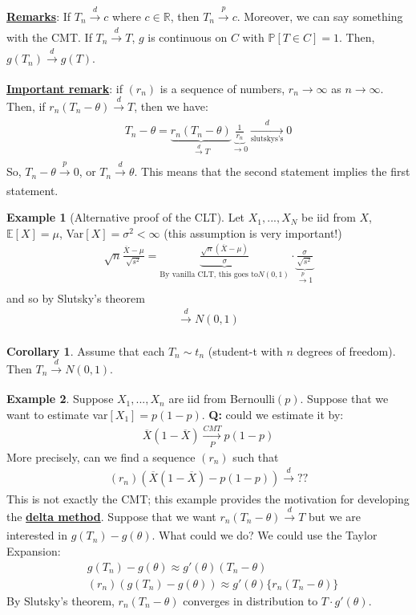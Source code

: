 \documentclass[11pt]{scrartcl}
\newcommand{\R}[0]{\mathbb{R}}
\theoremstyle{definition}
\newtheorem{corollary}{Corollary}
\newtheorem{ex}{Example}
\theoremstyle{remark}
\newcommand{\dfn}[1]{\textbf{\underline{#1}}}
\newcommand{\pr}[1]{\mathbb{P}[#1]}
\newcommand{\EX}[1]{\mathbb{E}\left[#1 \right]}
\begin{document}
\dfn{Remarks}: If $T_n \xrightarrow[]{d} c$ where $c \in \R$, then $T_n \xrightarrow[]{p} c$. Moreover, we can say something with the CMT. If $T_n \xrightarrow[]{d} T$, $g$ is continuous on $C$ with $\pr{T \in C} = 1$. Then, $g(T_n) \xrightarrow[]{d} g(T)$. 

\dfn{Important remark}: if $(r_n)$ is a sequence of numbers, $r_n \rightarrow \infty$ as $n \rightarrow \infty$. Then, if $r_n (T_n - \theta) \xrightarrow[]{d} T$, then we have: 
\begin{align*} 
	T_n - \theta = \underbrace{r_n(T_n - \theta)}_{\xrightarrow[]{d} T} \underbrace{ \frac{1}{r_n}	}_{\rightarrow 0} \xrightarrow[\text{slutskys's}]{d} 0 
\end{align*}
So, $T_n - \theta \xrightarrow[]{p} 0$, or $T_n \xrightarrow[]{d} \theta$. This means that the second statement implies the first statement. 

\begin{ex}[Alternative proof of the CLT] 
		Let $X_1,..., X_N$ be iid from $X$, $\EX{X} = \mu$, Var$[X] = \sigma^2 < \infty$ (this assumption is very important!) 
		\begin{align}
			\sqrt{n} \frac{\overline{X} - \mu}{\sqrt{s^2}} = \underbrace{\frac{\sqrt{n} (\overline{X} - \mu)}{\sigma}}_{\text{By vanilla CLT, this goes to} N(0,1)} \cdot \underbrace{\frac{\sigma}{\sqrt{s^2}}}_{\xrightarrow[]{p} 1}
		\end{align}
		and so by Slutsky's theorem 
		\begin{align*} 
			\xrightarrow[]{d} N(0,1) 	
		\end{align*}
\end{ex}

\begin{corollary} Assume that each $T_n \sim t_n$ (student-t with $n$ degrees of freedom). Then $T_n \xrightarrow[]{d} N(0,1)$. 
	
\end{corollary}

\begin{ex}
	Suppose $X_1, ..., X_n$ are iid from Bernoulli$(p)$. Suppose that we want to estimate var$[X_1] = p(1-p)$. \textbf{Q:} could we estimate it by: 
	\begin{align*}
		\overline{X}(1- \overline{X} ) \xrightarrow[P]{CMT} p(1-p)	
	\end{align*}
	More precisely, can we find a sequence $(r_n)$ such that
	\begin{align*}
		(r_n) (\overline{X}(1-\overline{X}) - p(1-p) ) \xrightarrow[]{d} ?? 	
	\end{align*}
	This is not exactly the CMT; this example provides the motivation for developing the \dfn{delta method}. Suppose that we want $r_n(T_n - \theta) \xrightarrow[]{d} T$ but we are interested in $g(T_n) - g(\theta)$. What could we do? We could use the Taylor Expansion: 
	\begin{align*}
		& g(T_n) - g(\theta) \approx g'(\theta) (T_n - \theta) 	\\
		& (r_n) (g (T_n) - g(\theta) ) \approx g'(\theta) \{ r_n (T_n - \theta) \} 
	\end{align*}
	By Slutsky's theorem, $r_n(T_n - \theta)$ converges in distribution to $T \cdot g'(\theta)$. 
\end{ex}
\end{document}
